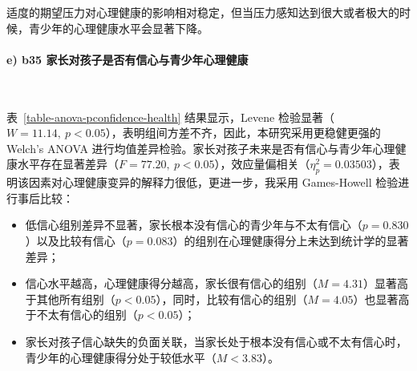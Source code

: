 \documentclass[zihao = -4, linespread = 1.5]{article}
\begin{document}
适度的期望压力对心理健康的影响相对稳定，但当压力感知达到很大或者极大的时候，青少年的心理健康水平会显著下降。

\paragraph*{e) b35 家长对孩子是否有信心与青少年心理健康}~{}

表~\ref{table-anova-pconfidence-health} 结果显示，Levene 检验显著（$W=11.14,\ p<0.05$），表明组间方差不齐，因此，本研究采用更稳健更强的 Welch's ANOVA 进行均值差异检验。家长对孩子未来是否有信心与青少年心理健康水平存在显著差异（$F=77.20,\ p<0.05$），效应量偏相关（$\eta^2_p=0.03503$），表明该因素对心理健康变异的解释力很低，更进一步，我采用 Games-Howell 检验进行事后比较：

\begin{itemize}
    \item 低信心组别差异不显著，家长根本没有信心的青少年与不太有信心（$p=0.830$）以及比较有信心（$p=0.083$）的组别在心理健康得分上未达到统计学的显著差异；
    \item 信心水平越高，心理健康得分越高，家长很有信心的组别（$M=4.31$）显著高于其他所有组别（$p<0.05$），同时，比较有信心的组别（$M=4.05$）也显著高于不太有信心的组别（$p<0.05$）；
    \item 家长对孩子信心缺失的负面关联，当家长处于根本没有信心或不太有信心时，青少年的心理健康得分处于较低水平（$M<3.83$）。
\end{itemize}
\end{document}
